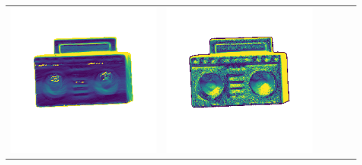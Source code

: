 \begin{center}
\begin{tabularx}{\linewidth}{@{}Y@{}Y@{}Y@{}Y@{}Y@{}Y@{}}
\includegraphics[width=\linewidth]{semisynthetic/20160617_19_yu_err.png} &
\includegraphics[width=\linewidth]{semisynthetic/20160617_19_dpsn_err.png} &

\end{tabularx}
\end{center}
